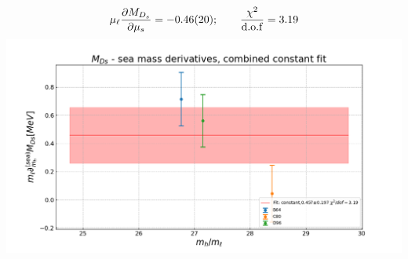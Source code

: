 \documentclass[xcolor={dvipsnames,table}]{beamer}
\begin{document}
\begin{frame}
\begin{columns}
\begin{column}{0.5\textwidth}
      \vspace*{-0.8cm} \,\\
      {\small $$\mu_\ell \frac{\partial M_{D_s}}{\partial \mu_s} = -0.46(20); \qquad\frac{\chi^2}{\rm d.o.f}= 3.19$$}
      \includegraphics[trim=0cm 0.5cm 0cm 1.3cm, clip,width=\textwidth]{plots/const_fit_MD_der_ms.png}
    \end{column}
  \end{columns}
\end{frame}
\end{document}
